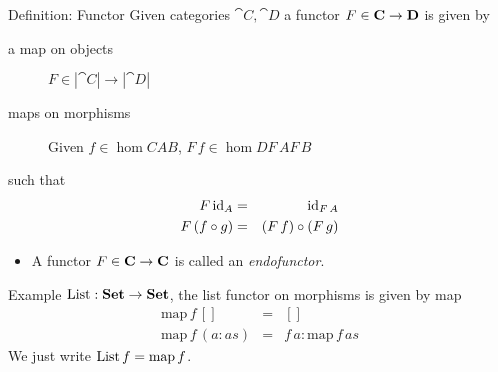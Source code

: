 \documentclass[handout]{beamer}
\begin{document}
\begin{frame}
  \begin{block}{Definition: Functor}
    Given categories $\cat{C},\cat{D}$ a functor $F\in \mathbf{C} \to \mathbf{D}$ is given by
    \begin{description}
    \item[a map on objects] $F \in |\cat{C}| \to |\cat{D}|$

    \item[maps on morphisms] Given $f\in \hom{C}{A}{B}$,
      $F\,f \in \hom{D}{F\,A}{F\,B}$
    \end{description}
    such that \vspace{-3ex}
    \begin{eqnarray*}
      F \,\mathrm{id}_A & = & \mathrm{id}_{F\,A}\\
      F \,(f \circ g) & = & (F\,f) \circ (F\, g)
    \end{eqnarray*}
  \end{block}
  \begin{itemize}
  \item A functor $F\in \mathbf{C} \to \mathbf{C}$ is called an \emph{endofunctor}.
  \end{itemize}

  \begin{block}{Example}
    $\mathrm{List} : \mathbf{Set} \to \mathbf{Set}$, the list functor on morphisms is given by 
    \textrm{map}
    \begin{eqnarray*}
      \mathrm{map}\,f\,[] & = & [] \\
      \mathrm{map}\,f\,(a:as) & = & f\,a : \mathrm{map}\,f\,as
    \end{eqnarray*}
    We just write $\mathrm{List}\,f = \mathrm{map}\,f$.
  \end{block}

\end{frame}
\end{document}
